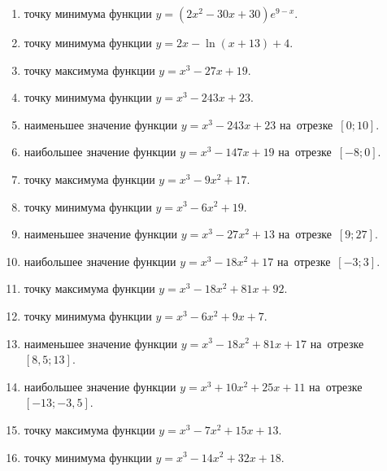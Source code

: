 \documentclass[a4paper,10pt]{article}
\begin{document}
\begin{enumerate}
\item {} точку минимума функции $y=\left(2x^2-30x+30\right){{e}^{9-x}}$.

\item {} точку минимума функции $y=2x-\ln \left(x+13\right)+4$.

\item {} точку максимума функции $y=x^3 -27x +19$.

\item {} точку минимума функции $y=x^3 -243x+23$.

\item {} наименьшее значение функции $y=x^3 -243x+23$ на~отрезке~$\left[0;10\right]$.

\item {} наибольшее значение функции $y=x^3 -147x+19$ на~отрезке~$\left[-8;0\right]$.

\item {} точку максимума функции $y=x^3 -9x^2+17$.

\item {} точку минимума функции $y=x^3 -6x^2+19$.

\item {} наименьшее значение функции $y=x^3 -27x^2+13$ на~отрезке~$\left[9;27\right]$.

\item {} наибольшее значение функции $y=x^3 -18x^2+17$ на~отрезке~$\left[-3;3\right]$.

\item {} точку максимума функции $y=x^3 -18x^2+81x+92$.

\item {} точку минимума функции $y=x^3 -6x^2+9x+7$.

\item {} наименьшее значение функции $y=x^3 -18x^2+81x+17$ на~отрезке~$\left[8,5;13\right]$.

\item {} наибольшее значение функции $y=x^3 +10x^2+25x+11$ на~отрезке~$\left[-13;-3,5\right]$.

\item {} точку максимума функции $y=x^3 -7x^2+15x+13$.

\item {} точку минимума функции $y=x^3 -14x^2+32x+18$.


\end{enumerate}
\end{document}
